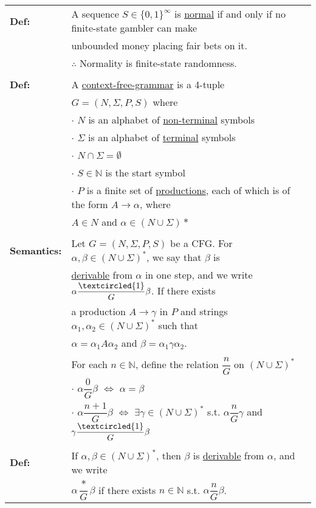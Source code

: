 \documentclass[11pt]{article}
\begin{document}
\begin{longtable}{ll}
{\bf Def:} & A sequence $S\in\{0,1\}^{\infty}$ is \underline{normal} if and only if no finite-state gambler can make \\
& unbounded money placing fair bets on it. \\
& $\therefore$ Normality is finite-state randomness.\\
\\
{\bf Def:} & A \underline{context-free-grammar} is a 4-tuple \\
& $G=(N,\Sigma,P,S)$ where \\
& $\cdot$ $N$ is an alphabet of \underline{non-terminal} symbols \\
& $\cdot$ $\Sigma$ is an alphabet of \underline{terminal} symbols \\
& $\cdot$ $N \cap \Sigma = \emptyset$ \\
& $\cdot$ $S\in\mathbb{N}$ is the start symbol \\
& $\cdot$ $P$ is a finite set of \underline{productions}, each of which is of the form $A\rightarrow \alpha$, where \\
& $A \in N$ and $\alpha\in(N\cup\Sigma)*$ \\
\\
{\bf Semantics:} & Let $G=(N,\Sigma,P,S)$ be a CFG. For $\alpha,\beta\in(N\cup\Sigma)^*$, we say that $\beta$ is \\
& \underline{derivable} from $\alpha$ in one step, and we write $\alpha\dfrac{\textcircled{1}}{G}\beta$. If there exists \\
& a production $A\rightarrow\gamma$ in $P$ and strings $\alpha_1,\alpha_2\in(N\cup\Sigma)^*$ such that \\ 
& $\alpha = \alpha_1A\alpha_2$ and $\beta=\alpha_1\gamma\alpha_2$. \\
& \\
& For each $n\in\mathbb{N}$, define the relation $\dfrac{n}{G}$ on $(N\cup\Sigma)^*$\\
& $\cdot$ $\alpha\dfrac{0}{G}\beta$ $\Leftrightarrow$ $\alpha = \beta$ \\
& $\cdot$ $\alpha\dfrac{n+1}{G}\beta$ $\Leftrightarrow$ $\exists\gamma\in(N\cup\Sigma)^*$ s.t. $\alpha\dfrac{n}{G}\gamma$ and $\gamma\dfrac{\textcircled{1}}{G}\beta$ \\
\\
{\bf Def:} & If $\alpha,\beta\in(N\cup\Sigma)^*$, then $\beta$ is \underline{derivable} from $\alpha$, and we write \\
& $\alpha\dfrac{*}{G}\beta$ if there exists $n\in\mathbb{N}$ s.t. $\alpha\dfrac{n}{G}\beta$. \\

\end{longtable}
\end{document}
